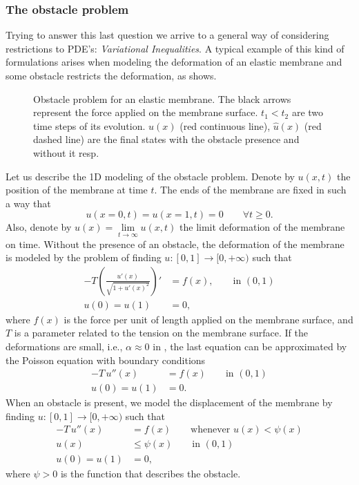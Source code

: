 \subsubsection*{The obstacle problem}
Trying to answer this last question we arrive to a general way of considering restrictions to PDE's: \emph{Variational Inequalities}. A typical example of this kind of formulations arises when modeling the deformation of an elastic membrane and some obstacle restricts the deformation, as  shows.
\begin{figure}[h!]
\centering 
\def\svgwidth{\textwidth}	
\footnotesize{
\caption[Obstacle problem for an elastic membrane.]{Obstacle problem for an elastic membrane. The black arrows represent the force applied on the membrane surface. $t_1<t_2$ are two time steps of its evolution. $u(x)$ (red continuous line), $\hat{u}(x)$ (red dashed line) are the final states with the obstacle presence and without it resp.}\label{fig:obstacle_problem}}
\end{figure}

Let us describe the 1D modeling of the obstacle problem. Denote by $u(x,t)$ the position of the membrane at time $t$. The ends of the membrane are fixed in such a way that $$u(x=0,t)=u(x=1,t)=0\qquad\forall t\geq 0.$$Also, denote by $u(x)=\underset{t\rightarrow \infty}{\lim}u(x,t)$ the limit deformation of the membrane on time. Without the presence of an obstacle, the deformation of the membrane is modeled by the problem of finding $u:[0,1]\rightarrow [0,+\infty)$ such that
\begin{align*}
-T\left( \frac{u'(x)}{\sqrt{1+u'(x)^2}} \right)'&=f(x),\qquad\text{in } (0,1)\\
u(0)=u(1)&=0,
\end{align*}
where $f(x)$ is the force per unit of length applied on the membrane surface, and $T$ is a parameter related to the tension on the membrane surface. If the deformations are small, i.e., $\alpha\approx 0$ in , the last equation can be approximated by the Poisson equation with boundary conditions
\begin{align*}
-T\,u''(x)&=f(x)\qquad\text{in } (0,1)\\
u(0)=u(1)&=0.
\end{align*}
When an obstacle is present, we model the displacement of the membrane by finding $u:[0,1]\rightarrow [0,+\infty)$ such that
\begin{align*}
-T\,u''(x)&=f(x)\qquad\text{whenever }u(x)<\psi(x)\\
u(x)&\leq \psi(x)\qquad\text{in } (0,1)\\
u(0)=u(1)&=0,
\end{align*}
where $\psi>0$ is the function that describes the obstacle.

